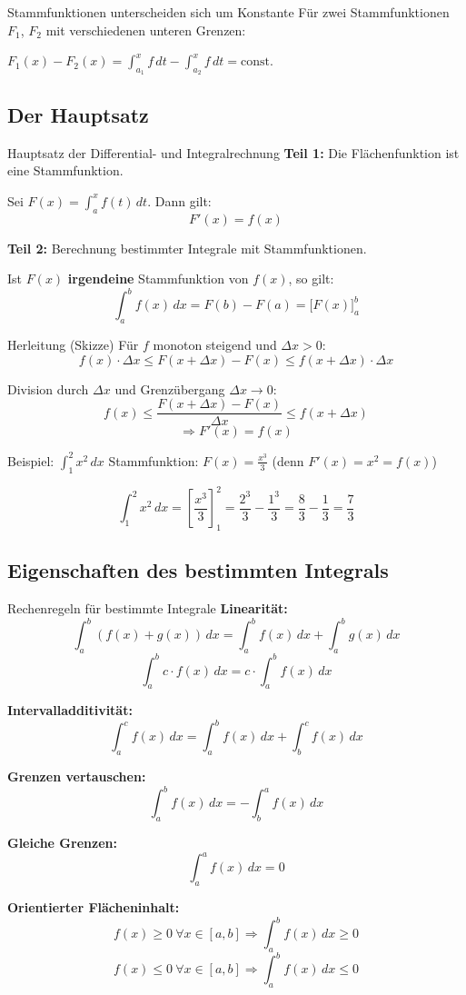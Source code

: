 \documentclass[a4paper,fontsize = 7pt]{scrartcl}
\begin{document}
\begin{subbox}{Stammfunktionen unterscheiden sich um Konstante}
Für zwei Stammfunktionen $F_1$, $F_2$ mit verschiedenen unteren Grenzen:

$F_1(x) - F_2(x) = \int_{a_1}^x f\,dt - \int_{a_2}^x f\,dt = \text{const.}$
\end{subbox}

\subsection{Der Hauptsatz}

\begin{mainbox}{Hauptsatz der Differential- und Integralrechnung}
\textbf{Teil 1:} Die Flächenfunktion ist eine Stammfunktion.

Sei $F(x) = \int_a^x f(t)\,dt$. Dann gilt:
$$\boxed{F'(x) = f(x)}$$

\textbf{Teil 2:} Berechnung bestimmter Integrale mit Stammfunktionen.

Ist $F(x)$ \textbf{irgendeine} Stammfunktion von $f(x)$, so gilt:
$$\boxed{\int_a^b f(x) \, dx = F(b) - F(a) = \Big[F(x)\Big]_a^b}$$
\end{mainbox}

\begin{subbox}{Herleitung (Skizze)}
Für $f$ monoton steigend und $\Delta x > 0$:
$$f(x) \cdot \Delta x \leq F(x + \Delta x) - F(x) \leq f(x + \Delta x) \cdot \Delta x$$

Division durch $\Delta x$ und Grenzübergang $\Delta x \to 0$:
$$f(x) \leq \frac{F(x + \Delta x) - F(x)}{\Delta x} \leq f(x + \Delta x)$$
$$\Rightarrow F'(x) = f(x)$$
\end{subbox}

\begin{subbox}{Beispiel: $\int_1^2 x^2 \, dx$}
Stammfunktion: $F(x) = \frac{x^3}{3}$ \quad (denn $F'(x) = x^2 = f(x)$)

$$\int_1^2 x^2 \, dx = \left[\frac{x^3}{3}\right]_1^2 = \frac{2^3}{3} - \frac{1^3}{3} = \frac{8}{3} - \frac{1}{3} = \frac{7}{3}$$
\end{subbox}

\subsection{Eigenschaften des bestimmten Integrals}

\begin{mainbox}{Rechenregeln für bestimmte Integrale}
\textbf{Linearität:}
$$\int_a^b (f(x) + g(x)) \, dx = \int_a^b f(x) \, dx + \int_a^b g(x) \, dx$$
$$\int_a^b c \cdot f(x) \, dx = c \cdot \int_a^b f(x) \, dx$$

\textbf{Intervalladditivität:}
$$\int_a^c f(x) \, dx = \int_a^b f(x) \, dx + \int_b^c f(x) \, dx$$

\textbf{Grenzen vertauschen:}
$$\int_a^b f(x) \, dx = -\int_b^a f(x) \, dx$$

\textbf{Gleiche Grenzen:}
$$\int_a^a f(x) \, dx = 0$$

\textbf{Orientierter Flächeninhalt:}
$$f(x) \geq 0 \ \forall x \in [a,b] \Rightarrow \int_a^b f(x)\,dx \geq 0$$
$$f(x) \leq 0 \ \forall x \in [a,b] \Rightarrow \int_a^b f(x)\,dx \leq 0$$
\end{mainbox}
\end{document}

